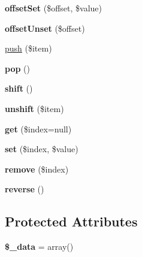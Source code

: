 \begin{DoxyCompactItemize}
\item 
\hypertarget{classArrayList_a90473248c6f6b2fa58717cb2bedbc94e}{
{\bfseries offsetSet} (\$offset, \$value)}
\label{classArrayList_a90473248c6f6b2fa58717cb2bedbc94e}

\item 
\hypertarget{classArrayList_a32abe6ce9d3649778a3b146c953fad3b}{
{\bfseries offsetUnset} (\$offset)}
\label{classArrayList_a32abe6ce9d3649778a3b146c953fad3b}

\item 
\hyperlink{classArrayList_af8a43bf653ecd0dc477c89d525ca1695}{push} (\$item)
\item 
\hypertarget{classArrayList_ac1d51079cc61e1e94ad1766a1842a97f}{
{\bfseries pop} ()}
\label{classArrayList_ac1d51079cc61e1e94ad1766a1842a97f}

\item 
\hypertarget{classArrayList_a4d3b61218b90023d52486c6b3dbcf314}{
{\bfseries shift} ()}
\label{classArrayList_a4d3b61218b90023d52486c6b3dbcf314}

\item 
\hypertarget{classArrayList_a197cee959e624c083c4285754af05680}{
{\bfseries unshift} (\$item)}
\label{classArrayList_a197cee959e624c083c4285754af05680}

\item 
\hypertarget{classArrayList_ab98a7fb4149de5e31b39fe0bbe4d435e}{
{\bfseries get} (\$index=null)}
\label{classArrayList_ab98a7fb4149de5e31b39fe0bbe4d435e}

\item 
\hypertarget{classArrayList_a70cffc1017606dc401bacef19a4b2f42}{
{\bfseries set} (\$index, \$value)}
\label{classArrayList_a70cffc1017606dc401bacef19a4b2f42}

\item 
\hypertarget{classArrayList_a10020679f12e299af894de406eb4f34e}{
{\bfseries remove} (\$index)}
\label{classArrayList_a10020679f12e299af894de406eb4f34e}

\item 
\hypertarget{classArrayList_a04aef6ed21c038bf15e708a8dea8c7d1}{
{\bfseries reverse} ()}
\label{classArrayList_a04aef6ed21c038bf15e708a8dea8c7d1}

\end{DoxyCompactItemize}
\subsection*{Protected Attributes}
\begin{DoxyCompactItemize}
\item 
\hypertarget{classArrayList_aa2020764364f5af7bde0001145eb1e04}{
{\bfseries \$\_\-data} = array()}
\label{classArrayList_aa2020764364f5af7bde0001145eb1e04}

\end{DoxyCompactItemize}


